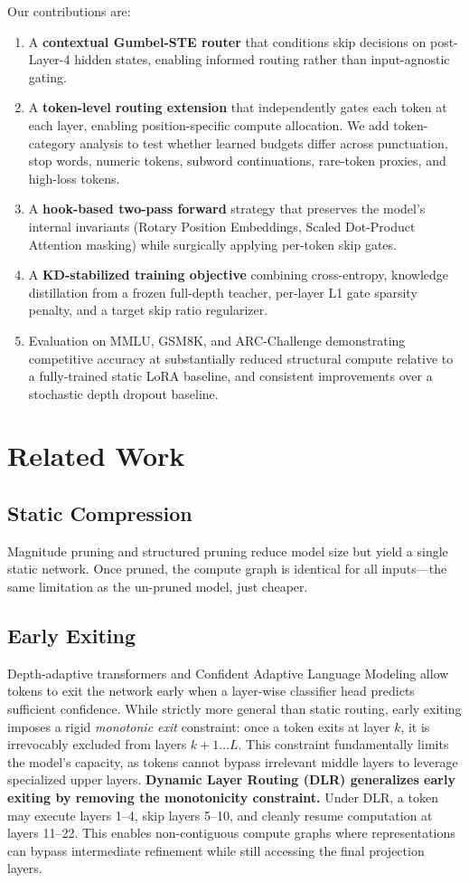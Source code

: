 \documentclass[conference]{IEEEtran}
\begin{document}
Our contributions are:
\begin{enumerate}
    \item A \textbf{contextual Gumbel-STE router} that conditions skip decisions on post-Layer-4 hidden states, enabling informed routing rather than input-agnostic gating.
    \item A \textbf{token-level routing extension} that independently gates each token at each layer, enabling position-specific compute allocation. We add token-category analysis to test whether learned budgets differ across punctuation, stop words, numeric tokens, subword continuations, rare-token proxies, and high-loss tokens.
    \item A \textbf{hook-based two-pass forward} strategy that preserves the model's internal invariants (Rotary Position Embeddings, Scaled Dot-Product Attention masking) while surgically applying per-token skip gates.
    \item A \textbf{KD-stabilized training objective} combining cross-entropy, knowledge distillation from a frozen full-depth teacher, per-layer L1 gate sparsity penalty, and a target skip ratio regularizer.
    \item Evaluation on MMLU, GSM8K, and ARC-Challenge demonstrating competitive accuracy at substantially reduced structural compute relative to a fully-trained static LoRA baseline, and consistent improvements over a stochastic depth dropout baseline.
\end{enumerate}

\section{Related Work}
\subsection{Static Compression}
Magnitude pruning and structured pruning reduce model size but yield a single static network. Once pruned, the compute graph is identical for all inputs---the same limitation as the un-pruned model, just cheaper.

\subsection{Early Exiting}
Depth-adaptive transformers \cite{elbayad2020} and Confident Adaptive Language Modeling \cite{schuster2022} allow tokens to exit the network early when a layer-wise classifier head predicts sufficient confidence. While strictly more general than static routing, early exiting imposes a rigid \textit{monotonic exit} constraint: once a token exits at layer $k$, it is irrevocably excluded from layers $k+1 \dots L$. This constraint fundamentally limits the model's capacity, as tokens cannot bypass irrelevant middle layers to leverage specialized upper layers. \textbf{Dynamic Layer Routing (DLR) generalizes early exiting by removing the monotonicity constraint.} Under DLR, a token may execute layers 1--4, skip layers 5--10, and cleanly resume computation at layers 11--22. This enables non-contiguous compute graphs where representations can bypass intermediate refinement while still accessing the final projection layers.
\end{document}
